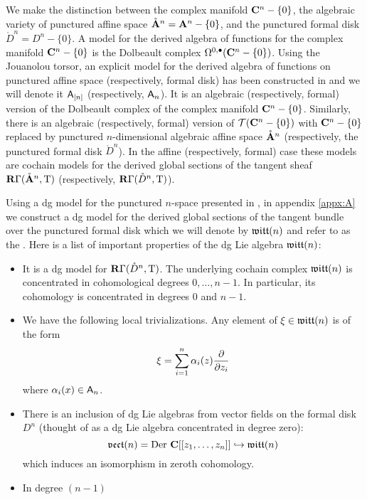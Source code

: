\documentclass[11pt]{amsart}
\renewcommand{\op}{\operatorname}
\begin{document}
We make the distinction between the complex manifold $\mathbf{C}^n-\{0\}$, the algebraic variety of punctured affine space $\mathring{{\mathbf{A}}}^{n}={\mathbf{A}}^n - \{0\}$, and the punctured formal disk $\mathring{D}^{n}=D^{n}-\{0\}$.
A model for the derived algebra of functions for the complex manifold $\mathbf{C}^{n}-\{0\}$ is the Dolbeault complex $\Omega^{0,\bullet}(\mathbf{C}^{n}-\{0\})$.
Using the Jouanolou torsor, an explicit model for the derived algebra of functions on punctured affine space (respectively, formal disk) has been constructed in \cite{FHK} and we will denote it $\mathsf A_{[n]}$ (respectively, $\mathsf A_{n}$).
It is an algebraic (respectively, formal) version of the Dolbeault complex of the complex manifold $\mathbf{C}^{n}-\{0\}$.
Similarly, there is an algebraic (respectively, formal) version of $\mathcal T(\mathbf{C}^n - \{0\})$ with $\mathbf{C}^n - \{0\}$ replaced by punctured $n$-dimensional algebraic affine space $\mathring{{\mathbf{A}}}^{n}$ (respectively, the punctured formal disk $\mathring{D}^{n}$).
In the affine (respectively, formal) case these models are cochain models for the derived global sections of the tangent sheaf $\mathbf{R} \Gamma(\mathring{{\mathbf{A}}}^{n},{\rm T})$ (respectively, $\mathbf{R} \Gamma(\mathring{D}^{n},{\rm T})$).

Using a dg model for the punctured $n$-space presented in \cite{FHK}, in appendix \ref{appx:A} we construct a dg model for the derived global sections of the tangent bundle over the punctured formal disk which we will denote by $\mathfrak{witt}(n)$ and refer to as the .
Here is a list of important properties of the dg Lie algebra $\mathfrak{witt}(n)$:
\begin{itemize}
  \item It is a dg model for $\mathbf{R} \Gamma(\mathring{D}^{n},{\rm T})$.
        The underlying cochain complex $\mathfrak{witt}(n)$ is concentrated in cohomological degrees $0,\ldots,n-1$. In particular, its cohomology is concentrated in degrees $0$ and $n-1$.
  \item We have the following local trivializations.
        Any element of $\xi \in \mathfrak{witt}(n)$ is of the form
        \begin{equation}\label{}
          \xi = \sum_{i=1}^{n} \alpha_{i}(z) \frac{\partial}{\partial z_{i}}
        \end{equation}
        where $\alpha_{i}(x) \in \mathsf A_{n}$.
\item There is an inclusion of dg Lie algebras from vector fields on the formal disk $D^n$ (thought of as a dg Lie algebra concentrated in degree zero):
\begin{equation}
\lie{vect}(n) = \op{Der} \, \C[[z_1,\ldots,z_n]] \hookrightarrow
\lie{witt}(n)
\end{equation}
which induces an isomorphism in zeroth cohomology.
\item In degree $(n-1)$ 
\end{itemize}
\end{document}
